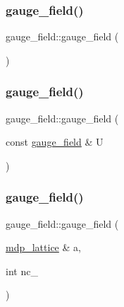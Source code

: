 \subsubsection{\texorpdfstring{gauge\+\_\+field()}{gauge\_field()}\hspace{0.1cm}{\footnotesize\ttfamily [1/3]}}
{\footnotesize\ttfamily gauge\+\_\+field\+::gauge\+\_\+field (\begin{DoxyParamCaption}{ }\end{DoxyParamCaption})\hspace{0.3cm}{\ttfamily [inline]}}

\mbox{\label{classgauge__field_a0500e23c8bd48d78650235e6ae668ab0}} 
\subsubsection{\texorpdfstring{gauge\+\_\+field()}{gauge\_field()}\hspace{0.1cm}{\footnotesize\ttfamily [2/3]}}
{\footnotesize\ttfamily gauge\+\_\+field\+::gauge\+\_\+field (\begin{DoxyParamCaption}\item[{const \hyperlink{classgauge__field}{gauge\+\_\+field} \&}]{U }\end{DoxyParamCaption})\hspace{0.3cm}{\ttfamily [inline]}}

\mbox{\label{classgauge__field_adcfa1a4c412dc26688307e95f3ed42b5}} 
\subsubsection{\texorpdfstring{gauge\+\_\+field()}{gauge\_field()}\hspace{0.1cm}{\footnotesize\ttfamily [3/3]}}
{\footnotesize\ttfamily gauge\+\_\+field\+::gauge\+\_\+field (\begin{DoxyParamCaption}\item[{\hyperlink{classmdp__lattice}{mdp\+\_\+lattice} \&}]{a,  }\item[{int}]{nc\+\_\+ }\end{DoxyParamCaption})\hspace{0.3cm}{\ttfamily [inline]}}



